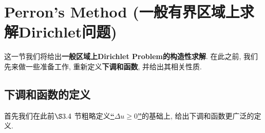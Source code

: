 \newpage

\section{Perron's Method (一般有界区域上求解Dirichlet问题)}
	这一节我们将给出\textbf{一般区域上Dirichlet Problem的构造性求解}. 在此之前, 我们先来做一些准备工作, 重新定义\textbf{下调和函数}, 并给出其相关性质. 
	
\vspace*{2em}

\subsection{下调和函数的定义}
	首先我们在此前$\S 3.4$ 节粗略定义\underline{\textbf{“$\Delta u \geq 0$”}}的基础上, 给出下调和函数更广泛的定义. 
	
	\vspace*{1em}
	
